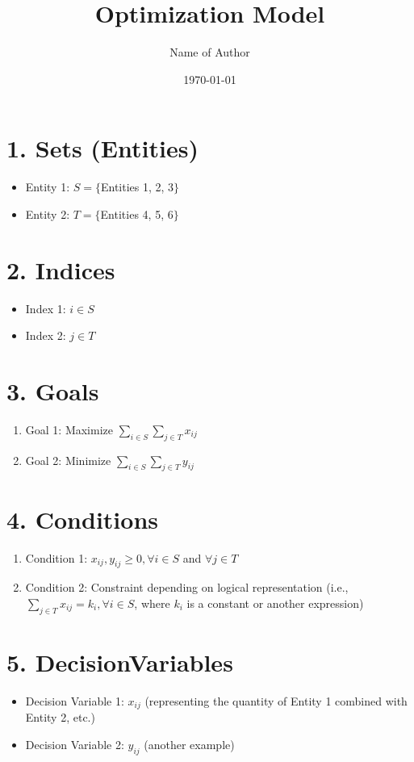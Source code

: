 \documentclass[12pt]{article}
\title{Optimization Model}
\author{Name of Author}
\date{\today}
\begin{document}
\maketitle

\tableofcontents

\section{1. Sets (Entities)}
\begin{itemize}
    \item Entity 1: $S = \{$Entities 1, 2, 3$\}$
    \item Entity 2: $T = \{$Entities 4, 5, 6$\}$
\end{itemize}

\section{2. Indices}
\begin{itemize}
    \item Index 1: $i \in S$
    \item Index 2: $j \in T$
\end{itemize}

\section{3. Goals}
\begin{enumerate}
    \item Goal 1: Maximize $\sum_{i \in S} \sum_{j \in T} x_{ij}$
    \item Goal 2: Minimize $\sum_{i \in S} \sum_{j \in T} y_{ij}$
\end{enumerate}

\section{4. Conditions}
\begin{enumerate}
    \item Condition 1: $x_{ij}, y_{ij} \geq 0, \forall i \in S$ and $\forall j \in T$
    \item Condition 2: Constraint depending on logical representation (i.e., $\sum_{j \in T} x_{ij} = k_i, \forall i \in S$, where $k_i$ is a constant or another expression)
\end{enumerate}

\section{5. DecisionVariables}
\begin{itemize}
    \item Decision Variable 1: $x_{ij}$ (representing the quantity of Entity 1 combined with Entity 2, etc.)
    \item Decision Variable 2: $y_{ij}$ (another example)
\end{itemize}
\end{document}
